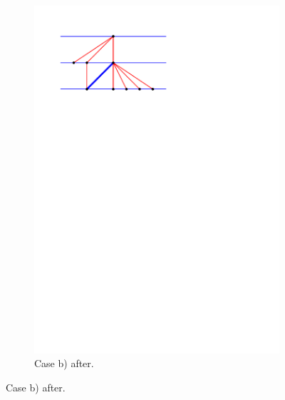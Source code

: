 \begin{figure}[!b]
\begin{subfigure}[t]{0.45 \textwidth}
        \includegraphics[width = \textwidth]{topFanFlips/img/newFlip/bAfter}
        \caption{Case b) after.}
    \end{subfigure}


\end{figure}
